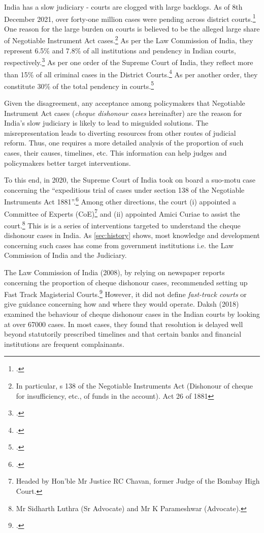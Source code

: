 India has a slow judiciary - courts are clogged with large backlogs. As of 8th December 2021, over forty-one million cases were pending across district courts.\footcite{njdg2021} One reason for the large burden on courts is believed to be the alleged large share of Negotiable Instrument Act cases.\footnote{In particular, s 138 of the Negotiable Instruments Act (Dishonour of cheque for insufficiency, etc., of funds in the account). Act 26 of 1881} As per the Law Commission of India, they represent 6.5\% and 7.8\% of all institutions and pendency in Indian courts, respectively.\footcite{lci2014_arrears} As per one order of the Supreme Court of India, they reflect more than 15\% of all criminal cases in the District Courts.\footcite{sc2020_makwanavstate} As per another order, they constitute 30\% of the total pendency in courts.\footcite{sc2020_138}

Given the disagreement, any acceptance among policymakers that Negotiable Instrument Act cases (\textit{cheque dishonour cases} hereinafter) are the reason for India's slow judiciary is likely to lead to misguided solutions. The misrepresentation leads to diverting resources from other routes of judicial reform. Thus, one requires a more detailed analysis of the proportion of such cases, their causes, timelines, etc. This information can help judges and policymakers better target interventions.

To this end, in 2020, the Supreme Court of India took on board a suo-motu case concerning the “expeditious trial of cases under section 138 of the Negotiable Instruments Act 1881”.\footcite{sc2020_138} Among other directions, the court (i) appointed a Committee of Experts (CoE)\footnote{Headed by Hon’ble Mr Justice RC Chavan, former Judge of the Bombay High Court.} and (ii) appointed Amici Curiae to assist the court.\footnote{Mr Sidharth Luthra (Sr Advocate) and Mr K Parameshwar (Advocate).} This is is a series of interventions targeted to understand the cheque dishonour cases in India. As \cref{sec:history} shows, most knowledge and development concerning such cases has come from government institutions i.e. the Law Commission of India and the Judiciary.

The Law Commission of India (2008), by relying on newspaper reports concerning the proportion of cheque dishonour cases, recommended setting up Fast Track Magisterial Courts.\footcite{lci2008_138, bhan2015_placing} However, it did not define \textit{fast-track courts} or give guidance concerning how and where they would operate. Daksh (2018) examined the behaviour of cheque dishonour cases in the Indian courts by looking at over 67000 cases. In most cases, they found that resolution is delayed well beyond statutorily prescribed timelines and that certain banks and financial institutions are frequent complainants.

